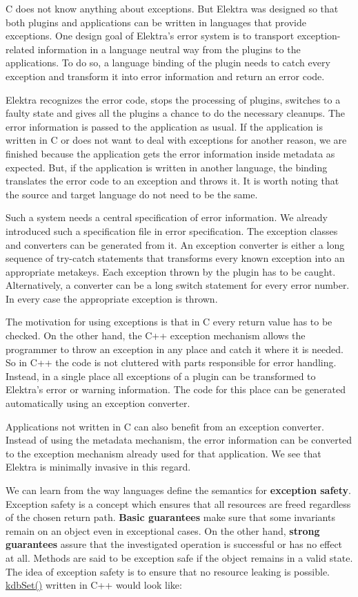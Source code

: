 C does not know anything about exceptions. But Elektra was designed so that both plugins and applications can be written in languages that provide exceptions. One design goal of Elektra’s error system is to transport exception-\/related information in a language neutral way from the plugins to the applications. To do so, a language binding of the plugin needs to catch every exception and transform it into error information and return an error code.

Elektra recognizes the error code, stops the processing of plugins, switches to a faulty state and gives all the plugins a chance to do the necessary cleanups. The error information is passed to the application as usual. If the application is written in C or does not want to deal with exceptions for another reason, we are finished because the application gets the error information inside metadata as expected. But, if the application is written in another language, the binding translates the error code to an exception and throws it. It is worth noting that the source and target language do not need to be the same.

Such a system needs a central specification of error information. We already introduced such a specification file in error specification. The exception classes and converters can be generated from it. An exception converter is either a long sequence of try-\/catch statements that transforms every known exception into an appropriate metakeys. Each exception thrown by the plugin has to be caught. Alternatively, a converter can be a long switch statement for every error number. In every case the appropriate exception is thrown.

The motivation for using exceptions is that in C every return value has to be checked. On the other hand, the C++ exception mechanism allows the programmer to throw an exception in any place and catch it where it is needed. So in C++ the code is not cluttered with parts responsible for error handling. Instead, in a single place all exceptions of a plugin can be transformed to Elektra’s error or warning information. The code for this place can be generated automatically using an exception converter.

Applications not written in C can also benefit from an exception converter. Instead of using the metadata mechanism, the error information can be converted to the exception mechanism already used for that application. We see that Elektra is minimally invasive in this regard.

We can learn from the way languages define the semantics for {\bfseries exception safety}. Exception safety is a concept which ensures that all resources are freed regardless of the chosen return path. {\bfseries Basic guarantees} make sure that some invariants remain on an object even in exceptional cases. On the other hand, {\bfseries strong guarantees} assure that the investigated operation is successful or has no effect at all. Methods are said to be exception safe if the object remains in a valid state. The idea of exception safety is to ensure that no resource leaking is possible. {\ttfamily \hyperlink{group__kdb_ga11436b058408f83d303ca5e996832bcf}{kdb\+Set()}} written in C++ would look like\+:


